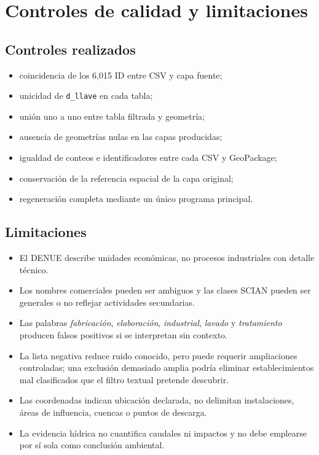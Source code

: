 \documentclass[11pt,letterpaper]{article}
\begin{document}
\section{Controles de calidad y limitaciones}

\subsection{Controles realizados}

\begin{itemize}
  \item coincidencia de los 6,015 ID entre CSV y capa fuente;
  \item unicidad de \texttt{d\_llave} en cada tabla;
  \item unión uno a uno entre tabla filtrada y geometría;
  \item ausencia de geometrías nulas en las capas producidas;
  \item igualdad de conteos e identificadores entre cada CSV y GeoPackage;
  \item conservación de la referencia espacial de la capa original;
  \item regeneración completa mediante un único programa principal.
\end{itemize}

\subsection{Limitaciones}

\begin{itemize}
  \item El DENUE describe unidades económicas, no procesos industriales con detalle técnico.
  \item Los nombres comerciales pueden ser ambiguos y las clases SCIAN pueden ser generales o no reflejar actividades secundarias.
  \item Las palabras \emph{fabricación}, \emph{elaboración}, \emph{industrial}, \emph{lavado} y \emph{tratamiento} producen falsos positivos si se interpretan sin contexto.
  \item La lista negativa reduce ruido conocido, pero puede requerir ampliaciones controladas; una exclusión demasiado amplia podría eliminar establecimientos mal clasificados que el filtro textual pretende descubrir.
  \item Las coordenadas indican ubicación declarada, no delimitan instalaciones, áreas de influencia, cuencas o puntos de descarga.
  \item La evidencia hídrica no cuantifica caudales ni impactos y no debe emplearse por sí sola como conclusión ambiental.
\end{itemize}
\end{document}
